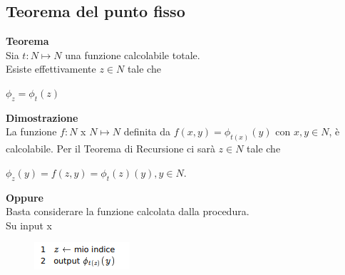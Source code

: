 \subsection{Teorema del punto fisso}
\textbf{Teorema}\\
 Sia $t : N \mapsto N$ una funzione calcolabile totale.\\
 Esiste effettivamente $z \in N$ tale che\\
 \begin{center}
     $\phi_z = \phi_t(z)$
 \end{center}
 \textbf{Dimostrazione}\\
La funzione $f : N$ x $N \mapsto N$ definita da $f(x,y) = \phi_{t(x)}(y)$ con $x,y \in N$, è
calcolabile. Per il Teorema di Recursione ci sarà $z \in N$ tale che\\
\begin{center}
    $\phi_z (y) = f (z,y) = \phi_t(z) (y),  y \in N.$
\end{center}
\textbf{Oppure}\\
Basta considerare la funzione calcolata dalla procedura.\\
Su input x\\
\begin{figure}[htp]
    \includegraphics[scale=0.8]{tesi_stile/img/cap6f7.png}
\end{figure}
\newpage
